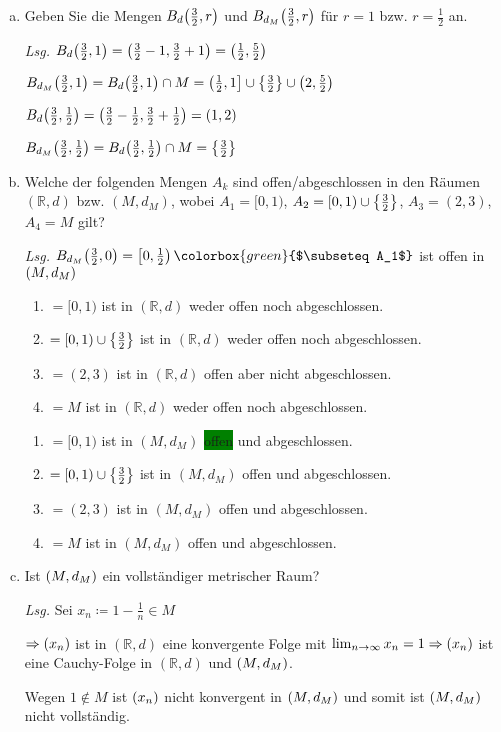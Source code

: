 \documentclass{article}
\begin{document}
\begin{enumerate}[a)]
\item Geben Sie die Mengen $B_d\qty(\frac{3}{2}, r)$ und $B_{d_M}\qty(\frac{3}{2}, r)$
  für $r = 1$ bzw. $r = \frac{1}{2}$ an.

  \textit{Lsg.} $B_d\qty(\frac{3}{2}, 1) = \qty(\frac{3}{2} - 1, \frac{3}{2} + 1) = \qty(\frac{1}{2}, \frac{5}{2})$

  $B_{d_M}\qty(\frac{3}{2}, 1) = B_d\qty(\frac{3}{2}, 1) \cap M = \left(\frac{1}{2}, 1\right] \cup \qty{\frac{3}{2}} \cup \qty(2, \frac{5}{2})$

  $B_d\qty(\frac{3}{2}, \frac{1}{2}) = \qty(\frac{3}{2} - \frac{1}{2}, \frac{3}{2} + \frac{1}{2}) = \qty(1, 2)$

  $B_{d_M}\qty(\frac{3}{2}, \frac{1}{2}) = B_d\qty(\frac{3}{2}, \frac{1}{2}) \cap M = \qty{\frac{3}{2}}$

\item Welche der folgenden Mengen $A_k$ sind offen/abgeschlossen in den Räumen $(\mathbb{R}, d)$
  bzw. $(M, d_M)$, wobei $A_1 = [0, 1)$, $A_2 = [0, 1) \cup \qty{\frac{3}{2}}$, $A_3 = (2, 3)$,
  $A_4 = M$ gilt?

  \textit{Lsg.}
  $B_{d_M}\qty(\frac{3}{2}, 0) = \left[0, \frac{1}{2}\right) \colorbox{green}{$\subseteq A_1$}$ ist offen in $\qty(M, d_M)$

  \begin{enumerate}[label={$A_{\arabic*}$}]
  \item $= [0, 1)$ ist in $(\mathbb{R}, d)$ weder offen noch abgeschlossen.
  \item $= [0, 1) \cup \qty{\frac{3}{2}}$ ist in $(\mathbb{R}, d)$ weder offen noch abgeschlossen.
  \item $= (2, 3)$ ist in $(\mathbb{R}, d)$ offen aber nicht abgeschlossen.
  \item $= M$ ist in $(\mathbb{R}, d)$ weder offen noch abgeschlossen.
  \end{enumerate}
  \begin{enumerate}[label={$A_{\arabic*}$}]
  \item $= [0, 1)$ ist in $(M, d_M)$ \colorbox{green}{offen} und abgeschlossen.
  \item $= [0, 1) \cup \qty{\frac{3}{2}}$ ist in $(M, d_M)$ offen und abgeschlossen.
  \item $= (2, 3)$ ist in $(M, d_M)$ offen und abgeschlossen.
  \item $= M$ ist in $(M, d_M)$ offen und abgeschlossen.
  \end{enumerate}

\item Ist $\qty(M, d_M)$ ein vollständiger metrischer Raum?

  \textit{Lsg.} Sei $x_n \coloneqq 1 - \frac{1}{n} \in M$

  $\Rightarrow \qty(x_n)$ ist in $(\mathbb{R}, d)$ eine konvergente Folge mit
  $\lim_{n \to \infty} x_n = 1 \Rightarrow \qty(x_n)$ ist eine Cauchy-Folge in
  $(\mathbb{R}, d)$ und $\qty(M, d_M)$.

  Wegen $1 \notin M$ ist $\qty(x_n)$ nicht konvergent in $\qty(M, d_M)$
  und somit ist $\qty(M, d_M)$ nicht vollständig.
\end{enumerate}
\end{document}
